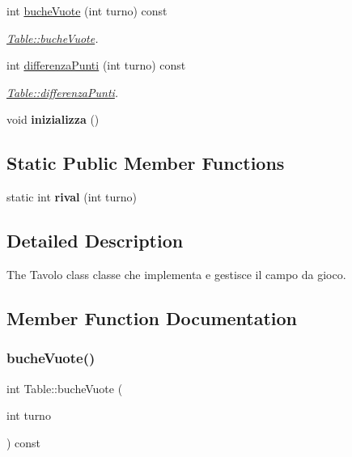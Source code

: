 \begin{DoxyCompactItemize}
int \hyperlink{classTable_a6aa69eac7c388df315d1fc7af532cf38}{buche\+Vuote} (int turno) const
\begin{DoxyCompactList}\small\item\em \hyperlink{classTable_a6aa69eac7c388df315d1fc7af532cf38}{Table\+::buche\+Vuote}. \end{DoxyCompactList}\item 
int \hyperlink{classTable_ade5ddf4ac9938a74db6b0d5bb8e9e29a}{differenza\+Punti} (int turno) const
\begin{DoxyCompactList}\small\item\em \hyperlink{classTable_ade5ddf4ac9938a74db6b0d5bb8e9e29a}{Table\+::differenza\+Punti}. \end{DoxyCompactList}\item 
\mbox{\label{classTable_a66bac686e8ada4c2617619deb5e06264}} 
void {\bfseries inizializza} ()
\end{DoxyCompactItemize}
\subsection*{Static Public Member Functions}
\begin{DoxyCompactItemize}
\item 
\mbox{\label{classTable_a5bcd33ee120923fa85241da5ede3bc1f}} 
static int {\bfseries rival} (int turno)
\end{DoxyCompactItemize}


\subsection{Detailed Description}
The Tavolo class classe che implementa e gestisce il campo da gioco. 

\subsection{Member Function Documentation}
\mbox{\label{classTable_a6aa69eac7c388df315d1fc7af532cf38}} 
\subsubsection{\texorpdfstring{buche\+Vuote()}{bucheVuote()}}
{\footnotesize\ttfamily int Table\+::buche\+Vuote (\begin{DoxyParamCaption}\item[{int}]{turno }\end{DoxyParamCaption}) const}



